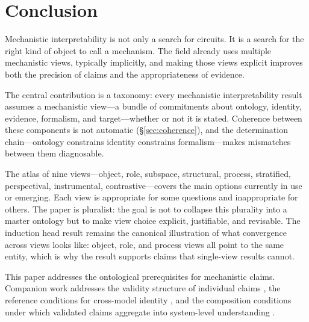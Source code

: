 \documentclass{article}
\begin{document}
\section{Conclusion}

Mechanistic interpretability is not only a search for circuits.  It is
a search for the right kind of object to call a mechanism.  The field
already uses multiple mechanistic views, typically implicitly, and making
those views explicit improves both the precision of claims and the
appropriateness of evidence.

The central contribution is a taxonomy: every mechanistic
interpretability result assumes a mechanistic view---a bundle of
commitments about ontology, identity, evidence, formalism, and
target---whether or not it is stated.  Coherence between these
components is not automatic (\S\ref{sec:coherence}), and the
determination chain---ontology constrains identity constrains
formalism---makes mismatches between them diagnosable.

The atlas of nine views---object, role, subspace, structural, process,
stratified, perspectival, instrumental, contrastive---covers the main
options currently in use or emerging.  Each view is appropriate for some
questions and inappropriate for others.  The paper is pluralist: the
goal is not to collapse this plurality into a master ontology but to
make view choice explicit, justifiable, and revisable.  The induction
head result remains the canonical illustration of what convergence
across views looks like: object, role, and process views all point to
the same entity, which is why the result supports claims that
single-view results cannot.

This paper addresses the ontological prerequisites for mechanistic
claims.  Companion work addresses the validity structure of individual
claims \citep{tower2026mechval}, the reference conditions for
cross-model identity \citep{tower2026mechref}, and the composition
conditions under which validated claims aggregate into system-level
understanding \citep{tower2026mechknow}.
\end{document}
